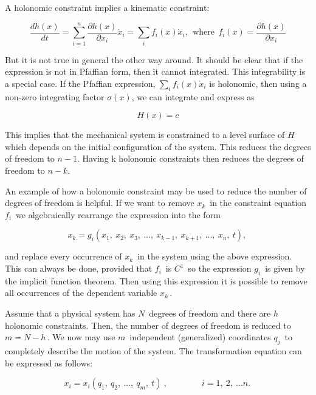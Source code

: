A holonomic constraint implies a kinematic constraint:

\[\frac{d h(x)}{dt} = \sum_{i=1}^n \frac{\partial h(x)}{\partial x_i} \dot{x}_i
= \sum_i f_i(x) \dot{x}_i , ~~ \mbox{where} ~~ f_i(x) = \frac{\partial h(x)}{\partial x_i}\]

But it is not true in general the other way around. It should be clear
that if the expression is not in Pfaffian form, then it cannot
integrated. This integrability is a special case. If the Pfaffian
expression, \(\sum_i f_i(x) \dot{x}_i\) is holonomic, then using a
non-zero integrating factor \(\sigma(x)\), we can integrate and express
as

\[H(x) = c\]

This implies that the mechanical system is constrained to a level
surface of \(H\) which depends on the initial configuration of the
system. This reduces the degrees of freedom to \(n-1\). Having k
holonomic constraints then reduces the degrees of freedom to \(n-k\).

An example of how a holonomic constraint may be used to reduce the
number of degrees of freedom is helpful. If we want to remove
\({\displaystyle x_{k}\,\!}\) in the constraint equation
\({\displaystyle f_{i}\,\!}\) we algebraically rearrange the expression
into the form

\[{\displaystyle x_{k}=g_{i}(x_{1},\ x_{2},\ x_{3},\ \dots ,\ x_{k-1},\ x_{k+1},\ \dots ,\ x_{n},\ t),\,}\]

and replace every occurrence of \({\displaystyle x_{k}\,\!}\) in the
system using the above expression. This can always be done, provided
that \({\displaystyle f_{i}\,\!}\) is \({\displaystyle C^{1}\,\!}\) so
the expression \({\displaystyle g_{i}\,}\) is given by the implicit
function theorem. Then using this expression it is possible to remove
all occurrences of the dependent variable \({\displaystyle x_{k}\,\!}\).

Assume that a physical system has \({\displaystyle N\,\!}\) degrees of
freedom and there are \({\displaystyle h\,\!}\) holonomic constraints.
Then, the number of degrees of freedom is reduced to
\({\displaystyle m=N-h\,\!}.\) We now may use \({\displaystyle m\,\!}\)
independent (generalized) coordinates \({\displaystyle q_{j}\,\!}\) to
completely describe the motion of the system. The transformation
equation can be expressed as follows:

\[{\displaystyle x_{i}=x_{i}(q_{1},\ q_{2},\ \ldots ,\ q_{m},\ t)\ ,\qquad  \qquad i=1,\ 2,\ \ldots n.\,}\]

